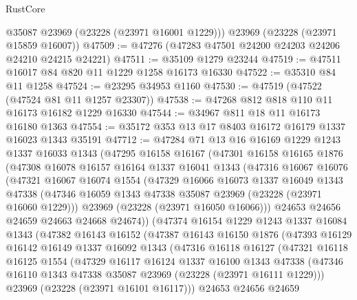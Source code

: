 \begin{lexlean}{RustCore}
\begin{coremodule}
      @35087
      @23969
      (@23228 (@23971 @16001 @1229)))
    @23969
    (@23228 (@23971 @15859 @16007))
@47509 := @47276 (@47283 @47501 @24200 @24203 @24206 @24210 @24215 @24221)
@47511 := @35109 @1279 @23244
@47519 := @47511 @16017 @84 @820 @11 @1229 @1258 @16173 @16330
@47522 := @35310 @84 @11 @1258
@47524 := @23295 @34953 @1160
@47530 := @47519 (@47522 (@47524 @81 @11 @1257 @23307))
@47538 := @47268 @812 @818 @110 @11 @16173 @16182 @1229 @16330
@47544 := @34967 @811 @18 @11 @16173 @16180 @1363
@47554 := @35172 @353 @13 @17 @8403 @16172 @16179 @1337 @16023 @1343 @35191
@47712 := @47284
    @71
    @13
    @16
    @16169
    @1229
    @1243
    @1337
    @16033
    @1343
    (@47295
      @16158
      @16167
      (@47301
        @16158
        @16165
        @1876
        (@47308
          @16078
          @16157
          @16164
          @1337
          @16041
          @1343
          (@47316
            @16067
            @16076
            (@47321
              @16067
              @16074
              @1554
              (@47329
                @16066
                @16073
                @1337
                @16049
                @1343
                @47338
                (@47346 @16059 @1343 @47338 @35087 @23969 (@23228 (@23971 @16060 @1229)))
                @23969
                (@23228 (@23971 @16050 @16066)))
              @24653
              @24656
              @24659
              @24663
              @24668
              @24674))
          (@47374
            @16154
            @1229
            @1243
            @1337
            @16084
            @1343
            (@47382
              @16143
              @16152
              (@47387
                @16143
                @16150
                @1876
                (@47393
                  @16129
                  @16142
                  @16149
                  @1337
                  @16092
                  @1343
                  (@47316
                    @16118
                    @16127
                    (@47321
                      @16118
                      @16125
                      @1554
                      (@47329
                        @16117
                        @16124
                        @1337
                        @16100
                        @1343
                        @47338
                        (@47346 @16110 @1343 @47338 @35087 @23969 (@23228 (@23971 @16111 @1229)))
                        @23969
                        (@23228 (@23971 @16101 @16117)))
                      @24653
                      @24656
                      @24659

\end{coremodule}
\end{lexlean}
